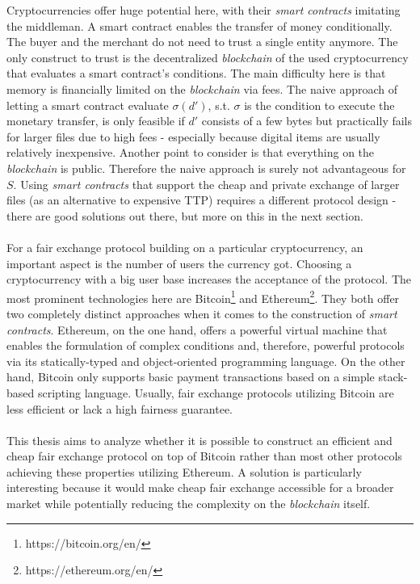 \documentclass{cacthesis}
\newcounter{protocol}
\begin{document}
        Cryptocurrencies offer huge potential here, with their \textit{smart contracts} imitating the middleman. A smart contract enables the transfer of money conditionally. The buyer and the merchant do not need to trust a single entity anymore. The only construct to trust is the decentralized \textit{blockchain} of the used cryptocurrency that evaluates a smart contract's conditions. The main difficulty here is that memory is financially limited on the \textit{blockchain} via fees. The naive approach of letting a smart contract evaluate $\sigma\left( d'\right)$, s.t. $\sigma$ is the condition to execute the monetary transfer, is only feasible if $d'$ consists of a few bytes but practically fails for larger files due to high fees - especially because digital items are usually relatively inexpensive. Another point to consider is that everything on the \textit{blockchain} is public. Therefore the naive approach is surely not advantageous for $S$. Using \textit{smart contracts} that support the cheap and private exchange of larger files (as an alternative to expensive TTP) requires a different protocol design - there are good solutions out there, but more on this in the next section.   \\\\  
        For a fair exchange protocol building on a particular cryptocurrency, an important aspect is the number of users the currency got. Choosing a cryptocurrency with a big user base increases the acceptance of the protocol. The most prominent technologies here are Bitcoin\footnote{https://bitcoin.org/en/} and Ethereum\footnote{https://ethereum.org/en/}. They both offer two completely distinct approaches when it comes to the construction of \textit{smart contracts}. Ethereum, on the one hand, offers a powerful virtual machine that enables the formulation of complex conditions and, therefore, powerful protocols via its statically-typed and object-oriented programming language. On the other hand, Bitcoin only supports basic payment transactions based on a simple stack-based scripting language. Usually, fair exchange protocols utilizing Bitcoin are less efficient or lack a high fairness guarantee. \\\\
        This thesis aims to analyze whether it is possible to construct an efficient and cheap fair exchange protocol on top of Bitcoin rather than most other protocols achieving these properties utilizing Ethereum. A solution is particularly interesting because it would make cheap fair exchange accessible for a broader market while potentially reducing the complexity on the \textit{blockchain} itself.
        
\end{document}
